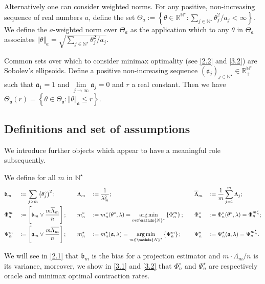 Alternatively one can consider weighted norms. For any positive, non-increasing sequence of real numbers $a$, define the set $\Theta_{a}:=\left\{\theta \in \mathds{R}^{\mathds{N}^{\star}} : \sum\limits_{j \in \mathds{N}^{\star}} \theta_{j}^{2}/a_{j} < \infty \right\}$. We define the $a$-weighted norm over $\Theta_{a}$ as the application which to any $\theta$ in $\Theta_{a}$ associates $\Vert \theta \Vert_{a} = \sqrt{\sum\limits_{j \in \mathds{N}^{\star}} \theta_{j}^{2} / a_{j} }$.

\medskip

Common sets over which to consider minimax optimality (see \textsc{\cref{2.2}} and \textsc{\cref{3.2}}) are Sobolev's ellipsoids.
Define a positive non-increasing sequence $\left(\mathfrak{a}_{j}\right)_{j \in \mathds{N}^{\star}} \in \mathds{R}_{+}^{\mathds{N}^{\star}}$ such that $\mathfrak{a}_{1} = 1$ and $\lim\limits_{j \rightarrow \infty} \mathfrak{a}_{j} = 0$ and $r$ a real constant.
Then we have $\Theta_{\mathfrak{a}}(r) = \left\{\theta \in \Theta_{\mathfrak{a}} : \Vert \theta \Vert_{\mathfrak{a}} \leq r \right\}.$

\subsection{Definitions and set of assumptions}\label{1.3}

We introduce further objects which appear to have a meaningful role subsequently.

\begin{de}\label{de1}
We define for all $m$ in $\mathds{N}^{\star}$
\begin{alignat*}{6}
&\mathfrak{b}_{m} &&:= \sum\limits_{j > m} \left(\theta^{\circ}_{j}\right)^{2}; \quad && \Lambda_{m} &&:= \frac{1}{\lambda_{m}^{2}} ; \quad &&\overline{\Lambda}_{m} &&:= \frac{1}{m} \sum\limits_{j = 1}^{m} \Lambda_{j};\\
& \Phi_{n}^{m} &&:= \left[\mathfrak{b}_{m} \vee \frac{m \overline{\Lambda}_{m}}{n}\right]; \quad && m_{n}^{\circ} &&:= m_{n}^{\circ}(\theta^{\circ}, \lambda) =\argmin\limits_{m \in \mathds{N}^{\star}}\left\{\Phi_{n}^{m}\right\}; \quad && \Phi_{n}^{\circ} &&:= \Phi_{n}^{\circ}(\theta^{\circ}, \lambda) = \Phi_{n}^{m^{\circ}_{n}};\\
& \Psi_{n}^{m} &&:= \left[\mathfrak{a}_{m} \vee \frac{m \overline{\Lambda_{m}}}{n}\right]; \quad && m_{n}^{\star} &&:= m_{n}^{\star}(\mathfrak{a}, \lambda) = \argmin\limits_{m \in \mathds{N}^{\star}} \left\{\Psi_{n}^{m}\right\}; \quad && \Psi_{n}^{\star} &&:= \Psi_{n}^{\star}(\mathfrak{a}, \lambda) = \Psi_{n}^{m_{n}^{\star}}.
\end{alignat*}
\end{de}
We will see in \textsc{\cref{2.1}} that $\mathfrak{b}_{m}$ is the bias for a projection estimator and $m \cdot \overline{\Lambda}_{m}/n$ is its variance, moreover, we show in \textsc{\cref{3.1}} and \textsc{\cref{3.2}} that $\Phi_{n}^{\circ}$ and $\Psi_{n}^{\star}$ are respectively oracle and minimax optimal contraction rates.


